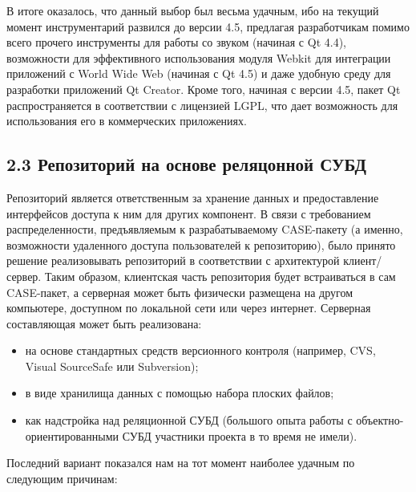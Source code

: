 \documentclass[a4paper]{article}
\newcommand\liststyleWWviiiNumix{%
\renewcommand\theenumi{\arabic{enumi}}
\renewcommand\theenumii{\arabic{enumii}}
\renewcommand\theenumiii{\arabic{enumiii}}
\renewcommand\labelitemi{[F0B7?]}
\renewcommand\labelenumi{\theenumi.}
\renewcommand\labelenumii{\theenumii.}
\renewcommand\labelenumiii{\theenumiii.}
}
\begin{document}
{
В итоге оказалось, что данный выбор был весьма удачным, ибо на текущий
момент инструментарий развился до версии 4.5, предлагая разработчикам
помимо всего прочего инструменты для работы со звуком (начиная с
\foreignlanguage{english}{Qt} 4.4), возможности для эффективного
использования модуля \foreignlanguage{english}{Webkit} для интеграции
приложений с \foreignlanguage{english}{World}
\foreignlanguage{english}{Wide} \foreignlanguage{english}{Web} (начиная
с \foreignlanguage{english}{Qt} 4.5) и даже удобную среду для
разработки приложений \foreignlanguage{english}{Qt}
\foreignlanguage{english}{Creator}. Кроме того, начиная с версии 4.5,
пакет \foreignlanguage{english}{Qt} распространяется в соответствии с
лицензией \foreignlanguage{english}{LGPL}, что дает возможность для
использования его в коммерческих приложениях.}


\bigskip

\subsection{2.3 Репозиторий на основе реляцонной СУБД}
{
Репозиторий является ответственным за хранение данных и предоставление
интерфейсов доступа к ним для других компонент. В связи с требованием
распределенности, предъявляемым к разрабатываемому
\foreignlanguage{english}{CASE}{}-пакету (а именно, возможности
удаленного доступа пользователей к репозиторию), было принято решение
реализовывать репозиторий в соответствии с архитектурой клиент/сервер.
Таким образом, клиентская часть репозитория будет встраиваться в сам
\foreignlanguage{english}{CASE}{}-пакет, а серверная может быть
физически размещена на другом компьютере, доступном по локальной сети
или через интернет. Серверная составляющая может быть реализована:}

\liststyleWWviiiNumix
\begin{itemize}
\item {
на основе стандартных средств версионного контроля (например,
\foreignlanguage{english}{CVS}, \foreignlanguage{english}{Visual}
\foreignlanguage{english}{SourceSafe} или
\foreignlanguage{english}{Subversion});}
\item {
в виде хранилища данных с помощью набора плоских файлов;}
\item {
как надстройка над реляционной СУБД (большого опыта работы с
объектно-ориентированными СУБД участники проекта в то время не имели).}
\end{itemize}
{
Последний вариант показался нам на тот момент наиболее удачным по
следующим причинам:}
\end{document}
